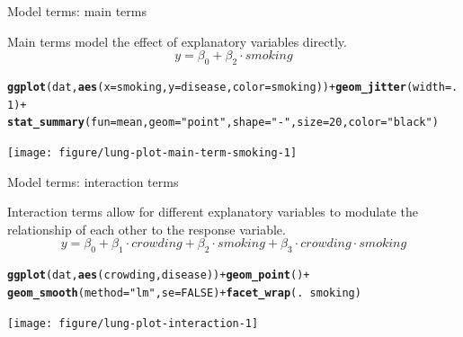 \documentclass[table]{beamer}\usepackage[]{graphicx}\usepackage[]{color}
\makeatletter
\newcommand{\hlnum}[1]{\textcolor[rgb]{0.686,0.059,0.569}{#1}}%
\newcommand{\hlstr}[1]{\textcolor[rgb]{0.192,0.494,0.8}{#1}}%
\newcommand{\hlopt}[1]{\textcolor[rgb]{0,0,0}{#1}}%
\newcommand{\hlstd}[1]{\textcolor[rgb]{0.345,0.345,0.345}{#1}}%
\newcommand{\hlkwc}[1]{\textcolor[rgb]{0.333,0.667,0.333}{#1}}%
\newcommand{\hlkwd}[1]{\textcolor[rgb]{0.737,0.353,0.396}{\textbf{#1}}}%
\newenvironment{kframe}{%
 \def\at@end@of@kframe{}%
 \ifinner\ifhmode%
  \def\at@end@of@kframe{\end{minipage}}%
  \begin{minipage}{\columnwidth}%
 \fi\fi%
 \def\FrameCommand##1{\hskip\@totalleftmargin \hskip-\fboxsep
 \colorbox{shadecolor}{##1}\hskip-\fboxsep
     \hskip-\linewidth \hskip-\@totalleftmargin \hskip\columnwidth}%
 \MakeFramed {\advance\hsize-\width
   \@totalleftmargin\z@ \linewidth\hsize
   \@setminipage}}%
 {\par\unskip\endMakeFramed%
 \at@end@of@kframe}
\newenvironment{knitrout}{}{} %
\makeatother
\begin{document}
\begin{frame}[fragile]{Model terms: main terms}

Main terms model the effect of explanatory variables directly. $$y = \beta_0 + \beta_2 \cdot smoking$$

\begin{knitrout}\footnotesize
{}\color{fgcolor}\begin{kframe}
\begin{alltt}
\hlkwd{ggplot}\hlstd{(dat,} \hlkwd{aes}\hlstd{(}\hlkwc{x}\hlstd{=smoking,} \hlkwc{y}\hlstd{=disease,} \hlkwc{color}\hlstd{=smoking))} \hlopt{+} \hlkwd{geom_jitter}\hlstd{(}\hlkwc{width}\hlstd{=}\hlnum{.1}\hlstd{)} \hlopt{+}
  \hlkwd{stat_summary}\hlstd{(}\hlkwc{fun}\hlstd{=mean,} \hlkwc{geom}\hlstd{=}\hlstr{"point"}\hlstd{,} \hlkwc{shape}\hlstd{=}\hlstr{"-"}\hlstd{,} \hlkwc{size}\hlstd{=}\hlnum{20}\hlstd{,} \hlkwc{color}\hlstd{=}\hlstr{"black"}\hlstd{)}
\end{alltt}
\end{kframe}
\texttt{[image: figure/lung-plot-main-term-smoking-1]} 

\end{knitrout}

\end{frame}


\begin{frame}[fragile]{Model terms: interaction terms}

Interaction terms allow for different explanatory variables to modulate the relationship of each other to the response variable. $$y = \beta_0 + \beta_1 \cdot crowding + \beta_2 \cdot smoking + \beta_3 \cdot crowding \cdot smoking$$

\begin{knitrout}\footnotesize
{}\color{fgcolor}\begin{kframe}
\begin{alltt}
\hlkwd{ggplot}\hlstd{(dat,} \hlkwd{aes}\hlstd{(crowding, disease))} \hlopt{+} \hlkwd{geom_point}\hlstd{()} \hlopt{+}
  \hlkwd{geom_smooth}\hlstd{(}\hlkwc{method}\hlstd{=}\hlstr{"lm"}\hlstd{,} \hlkwc{se}\hlstd{=}\hlnum{FALSE}\hlstd{)} \hlopt{+} \hlkwd{facet_wrap}\hlstd{(.}\hlopt{~}\hlstd{smoking)}
\end{alltt}
\end{kframe}
\texttt{[image: figure/lung-plot-interaction-1]} 

\end{knitrout}

\end{frame}
\end{document}
